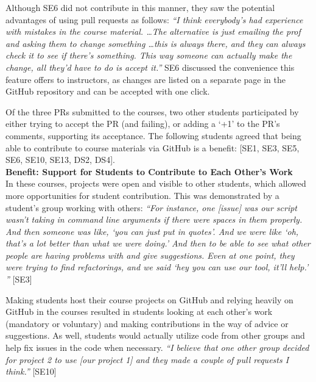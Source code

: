 Although SE6 did not contribute in this manner, they saw the potential advantages of using pull requests as follows: \textit{``I think everybody's had experience with mistakes in the course material. \ldots The alternative is just emailing the prof and asking them to change something \ldots this is always there, and they can always check it to see if there's something. This way someone can actually make the change, all they'd have to do is accept it.''} SE6 discussed the convenience this feature offers to instructors, as changes are listed on a separate page in the GitHub repository and can be accepted with one click.

Of the three PRs submitted to the courses, two other students participated by either trying to accept the PR (and failing), or adding a `+1' to the PR's comments, supporting its acceptance. The following students agreed that being able to contribute to course materials via GitHub is a benefit: [SE1, SE3, SE5, SE6, SE10, SE13, DS2, DS4]. \\ %


\textbf{Benefit: Support for Students to Contribute to Each Other's Work} \\
In these courses, projects were open and visible to other students, which allowed more opportunities for student contribution. This was demonstrated by a student's group working with others:
\textit{``For instance, one [issue] was our script wasn't taking in command line arguments if there were spaces in them properly. And then someone was like, `you can just put in quotes'. And we were like `oh, that's a lot better than what we were doing.' And then to be able to see what other people are having problems with and give suggestions. Even at one point, they were trying to find refactorings, and we said `hey you can use our tool, it'll help.' ''} [SE3]

Making students host their course projects on GitHub and relying heavily on GitHub in the courses resulted in students looking at each other's work (mandatory or voluntary) and making contributions in the way of advice or suggestions. As well, students would actually utilize code from other groups and help fix issues in the code when necessary. \textit{``I believe that one other group decided for project 2 to use [our project 1] and they made a couple of pull requests I think.''} [SE10]

